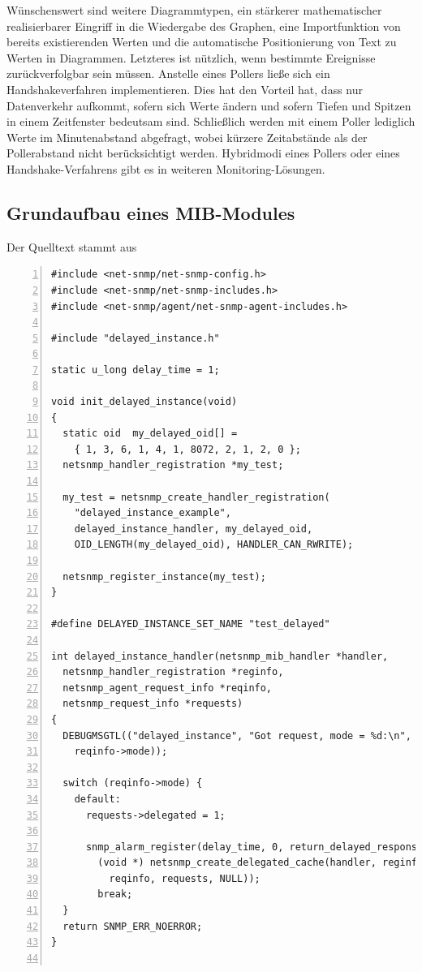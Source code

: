 \documentclass[12pt,ngerman,toc=listofnumbered,toc=bibliographynumbered,toc=index,headsepline=true]{scrbook}
\begin{document}
Wünschenswert sind weitere Diagrammtypen, ein stärkerer mathematischer
realisierbarer Eingriff in die Wiedergabe des Graphen, eine Importfunktion von
bereits existierenden Werten und die automatische Positionierung von Text zu
Werten in Diagrammen. Letzteres ist nützlich, wenn bestimmte Ereignisse
zurückverfolgbar sein müssen. Anstelle eines Pollers ließe sich ein
Handshakeverfahren implementieren. Dies hat den Vorteil hat, dass nur
Datenverkehr aufkommt, sofern sich Werte ändern und sofern Tiefen und Spitzen in
einem Zeitfenster bedeutsam sind. Schließlich werden mit einem Poller lediglich
Werte im Minutenabstand abgefragt, wobei kürzere Zeitabstände als der
Pollerabstand nicht berücksichtigt werden. Hybridmodi eines Pollers oder eines
Handshake-Verfahrens gibt es in weiteren Monitoring-Lösungen.
\newpage
\begin{appendix}
\chapter{Grundaufbau eines MIB-Modules}
\label{appendix:GrundaufbauMIBModul}
Der Quelltext stammt aus \cite{NetSNMP11}

\begin{lstlisting}[numbers=left]
#include <net-snmp/net-snmp-config.h>
#include <net-snmp/net-snmp-includes.h>
#include <net-snmp/agent/net-snmp-agent-includes.h>

#include "delayed_instance.h"

static u_long delay_time = 1;

void init_delayed_instance(void)
{
  static oid  my_delayed_oid[] =
    { 1, 3, 6, 1, 4, 1, 8072, 2, 1, 2, 0 };
  netsnmp_handler_registration *my_test;

  my_test = netsnmp_create_handler_registration(
    "delayed_instance_example",
    delayed_instance_handler, my_delayed_oid,
    OID_LENGTH(my_delayed_oid), HANDLER_CAN_RWRITE);

  netsnmp_register_instance(my_test);
}

#define DELAYED_INSTANCE_SET_NAME "test_delayed"

int delayed_instance_handler(netsnmp_mib_handler *handler,
  netsnmp_handler_registration *reginfo,
  netsnmp_agent_request_info *reqinfo,
  netsnmp_request_info *requests)
{
  DEBUGMSGTL(("delayed_instance", "Got request, mode = %d:\n",
    reqinfo->mode));

  switch (reqinfo->mode) {
    default:
      requests->delegated = 1;
      
      snmp_alarm_register(delay_time, 0, return_delayed_response,   
        (void *) netsnmp_create_delegated_cache(handler, reginfo,
          reqinfo, requests, NULL));
        break;
  }
  return SNMP_ERR_NOERROR;
}


\end{lstlisting}
\end{appendix}
\end{document}
